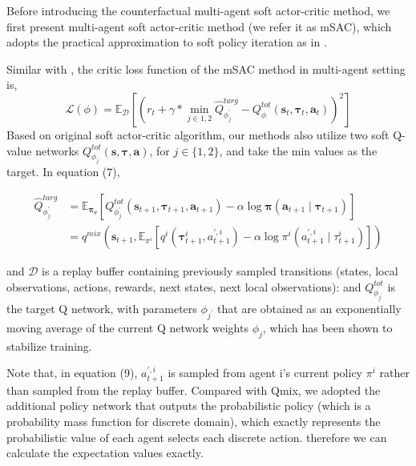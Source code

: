 \documentclass[runningheads]{llncs}
\begin{document}
Before introducing the counterfactual multi-agent soft actor-critic method, 
we first present multi-agent soft actor-critic method (we refer it as mSAC), which adopts the practical approximation to soft policy iteration as in \cite{b11}.

Similar with \cite{b11}, the critic loss function of the mSAC method in multi-agent setting is,
\begin{equation}
	\mathcal{L}(\phi)=\mathbb{E}_{ \mathcal{D}}\left[\left(r_{t}+\gamma * \min_{j \in {{1,2}}} \hat{Q}_{\phi_j^{\prime}}^{targ}-Q^{t o t}_{\phi}\left(\boldsymbol{s}_{t},\boldsymbol{\tau}_{t}, \boldsymbol{a}_{t}\right)\right)^{2}\right]
\end{equation}Based on original soft actor-critic algorithm, our methods also utilize two soft Q-value networks  $Q^{t o t}_{\phi_j}\left(\boldsymbol{s},\boldsymbol{\tau}, \boldsymbol{a} \right)$, for $j \in\{1,2\}$, and take the min values as the target.
In equation (7),
\begin{small}
	\begin{align}
		\hat{Q}_{\phi_j^{\prime}}^{targ}&=\mathbb{E}_{\boldsymbol{\pi}_{\theta}}\left[ Q^{t o t}_{\phi_j^{\prime}}\left(\boldsymbol{s}_{t+1},\boldsymbol{\tau}_{t+1}, \boldsymbol{a}_{t+1} \right)-\alpha \log \boldsymbol{\pi}\left(\boldsymbol{a}_{t+1} \mid \boldsymbol{\tau}_{t+1}\right)\right]\\
		&=q^{mix}\left(\boldsymbol{s}_{t+1},\mathbb{E}_{{\pi}^{i}} \left[ q^{i}\left(\boldsymbol{\tau}^{i}_{t+1}, a^{\prime, i}_{t+1}\right)-\alpha \log \pi^{i}\left(a^{\prime, i}_{t+1} \mid \tau^{i}_{t+1}\right)\right]\right)
	\end{align}
\end{small}
and $\mathcal{D}$ is a replay buffer containing previously sampled transitions (states, local observations, actions, rewards, next states, next local observations): 
and ${Q}^{tot}_{{\phi}_{j^{\prime}}}$  is the target Q network, with parameters ${\phi}_{j^{\prime}}$ that are obtained as an exponentially moving average of the current Q network weights  ${\phi}_{j}$, which has been shown to stabilize training.  

Note that, in equation (9), $a^{\prime, i}_{t+1}$ is sampled from agent i's current policy $\pi^i$ rather than sampled from the replay buffer. Compared with Qmix, we adopted the additional policy network that outputs the probabilistic policy (which is a probability mass function for discrete domain), which exactly represents the probabilistic value of each agent selects each discrete action. therefore we can calculate the expectation values exactly.
\end{document}
